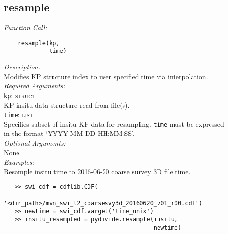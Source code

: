 \documentclass{article}
\begin{document}
\subsection{resample}
\label{subsec:resample}
\textit{Function Call:}\\
\vspace{-10mm}
\begin{verbatim}
    resample(kp,
             time)
\end{verbatim}
\vspace{-5mm}
\noindent
\textit{Description:}\\
\indent Modifies KP structure index to user specified time via interpolation.\\
\textit{Required Arguments:}\\
\indent \texttt{kp}: \textsc{struct}\\
\indent \indent KP insitu data structure read from file(s).\\ 
\indent \texttt{time}: \textsc{list}\\
\indent \indent Specifies subset of insitu KP data for resampling. \texttt{time} must be expressed\\
\indent \indent in the format `YYYY-MM-DD HH:MM:SS'.\\
\textit{Optional Arguments:}\\
\indent None.\\
\noindent \textit{Examples:}\\
\indent Resample insitu time to 2016-06-20 coarse survey 3D file time.
\vspace{-5mm}
\begin{verbatim}
   >> swi_cdf = cdflib.CDF(
                '<dir_path>/mvn_swi_l2_coarsesvy3d_20160620_v01_r00.cdf')
   >> newtime = swi_cdf.varget('time_unix')
   >> insitu_resampled = pydivide.resample(insitu,
                                           newtime)
\end{verbatim}
\end{document}
